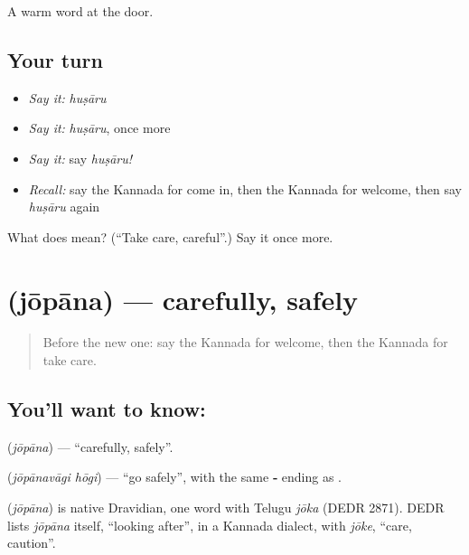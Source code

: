 \begin{grammarlens}[title={What you've built}]
A warm word at the door.
\end{grammarlens}

\subsection*{Your turn}
\begin{itemize}
\raggedright
  \item \emph{Say it:} \emph{huṣāru}
  \item \emph{Say it:} \emph{huṣāru}, once more
  \item \emph{Say it:} say \emph{huṣāru!}
  \item \emph{Recall:} say the Kannada for come in, then the Kannada for welcome, then say \emph{huṣāru} again
\end{itemize}

\begin{tcolorbox}[breakable,colback=teal!4,colframe=teal!35!black,title={Before you move on}]
What does  mean? (\textquotedblleft{}Take care, careful\textquotedblright{}.) Say it once more.
\end{tcolorbox}
\section[\texorpdfstring{\kn{ಜೋಪಾನ} (jōpāna)}{ಜೋಪಾನ (jōpāna)}]{ (jōpāna) — carefully, safely}

\label{lesson:KA-C89-safely}



\begin{quote}
Before the new one: say the Kannada for welcome, then the Kannada for take care.
\end{quote}

\subsection*{You'll want to know: }
\textbf{} (\emph{jōpāna}) — \textquotedblleft{}carefully, safely\textquotedblright{}.

\textbf{ } (\emph{jōpānavāgi hōgi}) — \textquotedblleft{}go safely\textquotedblright{}, with the same \textbf{‑} ending as \textbf{}.

\begin{cousinweb}
\textbf{} (\emph{jōpāna}) is native Dravidian, one word with Telugu \emph{jōka} (DEDR 2871). DEDR lists \emph{jōpāna} itself, \textquotedblleft{}looking after\textquotedblright{}, in a Kannada dialect, with \emph{jōke}, \textquotedblleft{}care, caution\textquotedblright{}.
\end{cousinweb}

